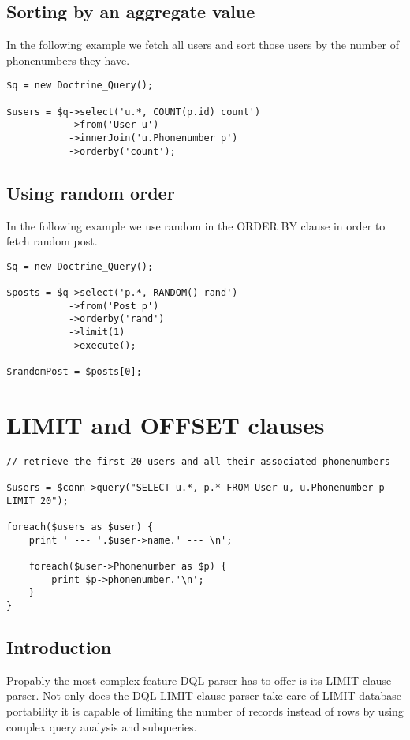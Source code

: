\documentclass[11pt,a4paper]{report}
\begin{document}
\subsection{Sorting by an aggregate value}
In the following example we fetch all users and sort those users by the number of phonenumbers they have.

\begin{verbatim}
$q = new Doctrine_Query();

$users = $q->select('u.*, COUNT(p.id) count')
           ->from('User u')
           ->innerJoin('u.Phonenumber p')
           ->orderby('count');
\end{verbatim}

\subsection{Using random order}
In the following example we use random in the ORDER BY clause in order to fetch random post.

\begin{verbatim}
$q = new Doctrine_Query();

$posts = $q->select('p.*, RANDOM() rand')
           ->from('Post p')
           ->orderby('rand')
           ->limit(1)
           ->execute();

$randomPost = $posts[0];
\end{verbatim}

\section{LIMIT and OFFSET clauses}
\begin{verbatim}
// retrieve the first 20 users and all their associated phonenumbers

$users = $conn->query("SELECT u.*, p.* FROM User u, u.Phonenumber p LIMIT 20");

foreach($users as $user) {
    print ' --- '.$user->name.' --- \n';

    foreach($user->Phonenumber as $p) {
        print $p->phonenumber.'\n';
    }
}
\end{verbatim}

\subsection{Introduction}
Propably the most complex feature DQL parser has to offer is its LIMIT clause parser. Not only does the DQL LIMIT clause parser take care of LIMIT database portability it is capable of limiting the number of records instead of rows by using complex query analysis and subqueries.
\end{document}
